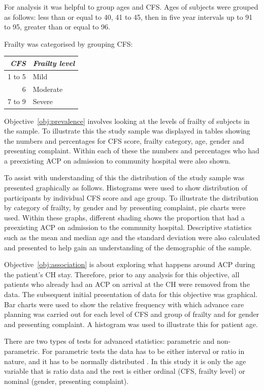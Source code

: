 \documentclass
[
	12pt,
	a4paper,
	oneside,
]{report}
\begin{document}
For analysis it was helpful to group ages and CFS. Ages of subjects were 
grouped as follows: less than or equal to 40, 41 to 45, then in five year 
intervals up to 91 to 95, greater than or equal to 96.

Frailty was categorised by grouping CFS:
\label{ref:cfs-grouping}

\begin{center}
\begin{tabular}{ r l }
\emph{CFS} & \emph{Frailty level} \\
\hline
1 to 5	& Mild	\\
6		& Moderate \\
7 to 9	& Severe \\
\end{tabular}
\end{center}

Objective~\ref{obj:prevalence} involves looking at the levels of frailty of
subjects in the sample. To illustrate this the study sample was 
displayed in tables showing the numbers and percentages for CFS score, 
frailty category, age, gender and presenting complaint. Within each
of these the numbers and percentages who had a preexisting ACP
on admission to community hospital were also shown.

To assist with understanding of this the distribution of the study sample 
was presented graphically as follows.
Histograms were used to show distribution of participants by individual 
CFS score and age group.  
To illustrate the distribution by category of frailty, by gender and by 
presenting 
complaint, pie charts were used. Within these graphs, different shading shows
the proportion that had a preexisting ACP on admission to the community hospital.
Descriptive statistics such as the mean and median age and the standard deviation
were also calculated and presented to help gain an understanding of the 
demographic of the sample.

Objective~\ref{obj:association} is about exploring what happens around ACP
during the patient's CH stay. Therefore, prior to any analysis for this 
objective, all patients who already had an ACP on arrival at the CH were
removed from the data.
The subsequent initial presentation of data for this objective was
graphical. Bar charts were used to show the relative frequency with which 
advance care planning
was carried out for each level of CFS and group of frailty and for gender and
presenting complaint. A histogram was used to illustrate this for patient age.

There are two types of tests for advanced statistics: parametric and
non-parametric. For parametric tests the data has to be either interval or
ratio in nature, and it has to be normally distributed \parencite{parahoo:14}.
In this study it is only the age variable that is ratio data and the rest is 
either ordinal
(CFS, frailty level) or nominal (gender, presenting complaint).
\end{document}
